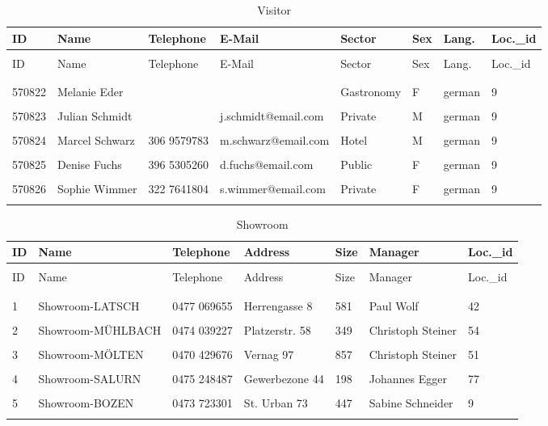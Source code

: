 \documentclass[letterpaper,12pt]{article}
\begin{document}
\begin{longtable}{p{1.3cm}p{1.6cm}p{1.8cm}p{3.6cm}p{2cm}p{.7cm}p{1.2cm}p{1.5cm}}
        \caption{Visitor} \\
        ID & Name & Telephone & E-Mail & Sector & Sex & Lang. & Loc.\_id \\
        \endfirsthead \\
        ID & Name & Telephone & E-Mail & Sector & Sex & Lang. & Loc.\_id \\
        \endhead \\
        \hline \\
        \color{red} 570822 & Melanie Eder &  &  & \color{red} Gastronomy & F & german & 9 \\
        \hline \\
        570823 & Julian Schmidt &  & j.schmidt@email.com & \color{red} Private & M & german & 9 \\
        \hline \\
        570824 & Marcel Schwarz & 306 9579783 & m.schwarz@email.com & \color{red} Hotel & M & german & 9 \\
        \hline \\
        570825 & Denise Fuchs & 396 5305260 & d.fuchs@email.com & \color{red} Public & F & german & 9 \\
        \hline \\
        570826 & Sophie Wimmer & 322 7641804 & s.wimmer@email.com & \color{red} Private & F & german & 9 \\
        \hline \\
\end{longtable} 

\begin{longtable}{p{0.25cm}p{3.9cm}p{2.2cm}p{2.9cm}p{.7cm}p{3.1cm}p{1.1cm}}
        \caption{Showroom} \\
        ID & Name & Telephone & Address & Size & Manager & Loc.\_id \\
        \endfirsthead \\
        ID & Name & Telephone & Address & Size & Manager & Loc.\_id \\
        \endhead \\
        \hline \\
        1 & Showroom-LATSCH & 0477 069655 & Herrengasse 8 & 581 & Paul Wolf & 42 \\
        \hline \\
        2 & Showroom-M{\"U}HLBACH & 0474 039227 & Platzerstr. 58 & 349 & Christoph Steiner & 54 \\
        \hline \\
        3 & Showroom-M{\"O}LTEN & 0470 429676 & Vernag 97 & 857 & Christoph Steiner & 51 \\
        \hline \\
        4 & Showroom-SALURN & 0475 248487 & Gewerbezone 44 & 198 & Johannes Egger & 77 \\
        \hline \\
        \color{red} 5 & \color{red} Showroom-BOZEN & 0473 723301 & St. Urban 73 & 447 & Sabine Schneider & 9 \\
        \hline \\
\end{longtable} 
\end{document}
